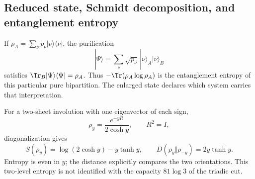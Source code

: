 

\subsection{Reduced state, Schmidt decomposition, and entanglement entropy}
If $\rho_A=\sum_\nu p_\nu|\nu\rangle\langle\nu|$,
the purification
\[
|\Psi\rangle=\sum_\nu\sqrt{p_\nu}\,
|\nu\rangle_A|\nu\rangle_B
\]
satisfies $\Tr_B|\Psi\rangle\langle\Psi|=\rho_A$.
Thus $-\Tr(\rho_A\log\rho_A)$ is the entanglement entropy
of this particular pure bipartition. The enlarged state declares
which system carries that interpretation.

For a two-sheet involution with one eigenvector of each sign,
\[
\rho_y=\frac{e^{-yR}}{2\cosh y},\qquad R^2=I,
\]
diagonalization gives
\[
S(\rho_y)=\log(2\cosh y)-y\tanh y,\qquad
D(\rho_y\Vert\rho_{-y})=2y\tanh y.
\]
Entropy is even in $y$; the distance explicitly compares
the two orientations. This two-level entropy is not identified
with the capacity $81\log3$ of the triadic cut.
